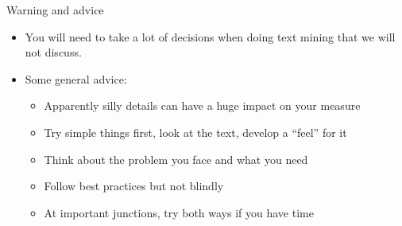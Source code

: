 \documentclass[english]{beamer}
\begin{document}
\begin{frame}{Warning and advice}

\begin{itemize}
\setlength{\itemsep}{1em}

\item You will need to take a lot of decisions when doing text mining that we will not discuss.

\item Some general advice:

\vspace{8pt}

\begin{itemize}
\setlength{\itemsep}{1em}
\setlength{\itemindent}{-0.8em}
\item Apparently silly details can have a huge impact on your measure

\item Try simple things first, look at the text, develop a ``feel'' for it

\item Think about the problem you face and what you need

\item Follow best practices but not blindly

\item At important junctions, try both ways if you have time
\end{itemize}
\end{itemize}
\end{frame}
\end{document}
